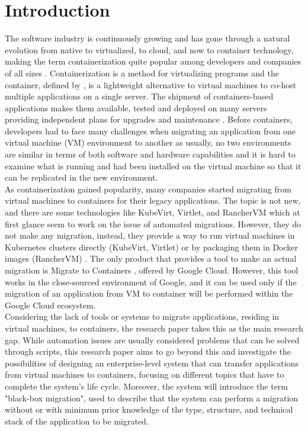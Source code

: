 \documentclass[twocolumn]{article}
\begin{document}
\section{Introduction}
The software industry is continuously growing and has gone through a natural evolution from native to virtualized, to cloud, and now to container technology, making the term containerization quite popular among developers and companies of all sizes \cite{SiddiquiEtAl-2020}. Containerization is a method for virtualizing programs \cite{VermaEtAl-2022} and the container, defined by \cite{GargEtAl-2024}, is a lightweight alternative to virtual machines to co-host multiple applications on a single server. The shipment of containers-based applications makes them available, tested and deployed on many servers \cite{VermaEtAl-2022} providing independent plans for upgrades and maintenance \cite{SiddiquiEtAl-2020}. Before containers, developers had to face many challenges when migrating an application from one virtual machine (VM) environment to another as usually, no two environments are similar in terms of both software and hardware capabilities \cite{SiddiquiEtAl-2020} and it is hard to examine what is running and had been installed on the virtual machine so that it can be replicated in the new environment. \\

As containerization gained popularity, many companies started migrating from virtual machines to containers for their legacy applications. The topic is not new, and there are some technologies like KubeVirt, Virtlet, and RancherVM which at first glance seem to work on the issue of automated migrations. However, they do not make any migration, instead, they provide a way to run virtual machines in Kubernetes clusters directly (KubeVirt, Virtlet)\cite{Sheldon-2022} or by packaging them in Docker images (RancherVM) \cite{Baccini-2021}. The only product that provides a tool to make an actual migration is Migrate to Containers \cite{Google-2024}, offered by Google Cloud. However, this tool works in the close-sourced environment of Google, and it can be used only if the migration of an application from VM to container will be performed within the Google Cloud ecosystem. \\

Considering the lack of tools or systems to migrate applications, residing in virtual machines, to containers, the research paper takes this as the main research gap. While automation issues are usually considered problems that can be solved through scripts, this research paper aims to go beyond this and investigate the possibilities of designing an enterprise-level system that can transfer applications from virtual machines to containers, focusing on different topics that have to complete the system's life cycle. Moreover, the system will introduce the term "black-box migration", used to describe that the system can perform a migration without or with minimum prior knowledge of the type, structure, and technical stack of the application to be migrated. \\
\end{document}
